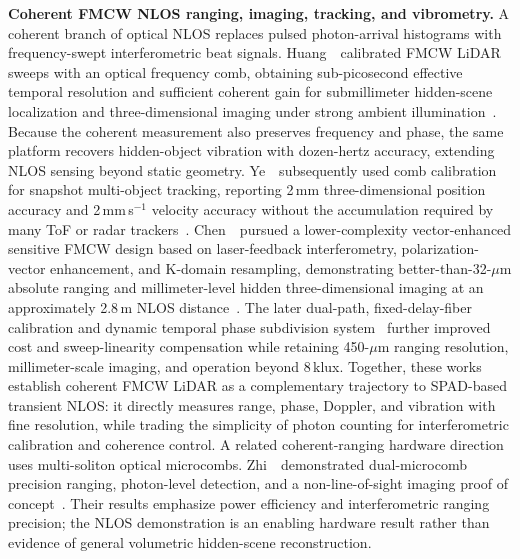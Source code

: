 \vspace{0.8mm}
\noindent \textbf{Coherent FMCW NLOS ranging, imaging, tracking, and vibrometry.}
A coherent branch of optical NLOS replaces pulsed photon-arrival histograms with frequency-swept interferometric beat signals. Huang~\etal~calibrated FMCW LiDAR sweeps with an optical frequency comb, obtaining sub-picosecond effective temporal resolution and sufficient coherent gain for submillimeter hidden-scene localization and three-dimensional imaging under strong ambient illumination~\cite{huangCombCalibratedNLOS2024}. Because the coherent measurement also preserves frequency and phase, the same platform recovers hidden-object vibration with dozen-hertz accuracy, extending NLOS sensing beyond static geometry. Ye~\etal~subsequently used comb calibration for snapshot multi-object tracking, reporting 2\,mm three-dimensional position accuracy and 2\,mm\,s$^{-1}$ velocity accuracy without the accumulation required by many ToF or radar trackers~\cite{yeCombCalibratedFMCWTracking2025}. Chen~\etal~pursued a lower-complexity vector-enhanced sensitive FMCW design based on laser-feedback interferometry, polarization-vector enhancement, and K-domain resampling, demonstrating better-than-32-$\mu$m absolute ranging and millimeter-level hidden three-dimensional imaging at an approximately 2.8\,m NLOS distance~\cite{chenVectorEnhancedFMCWNLOS2025}. The later dual-path, fixed-delay-fiber calibration and dynamic temporal phase subdivision system~\cite{liangFMCWNLOS2026} further improved cost and sweep-linearity compensation while retaining 450-$\mu$m ranging resolution, millimeter-scale imaging, and operation beyond 8\,klux. Together, these works establish coherent FMCW LiDAR as a complementary trajectory to SPAD-based transient NLOS: it directly measures range, phase, Doppler, and vibration with fine resolution, while trading the simplicity of photon counting for interferometric calibration and coherence control.
A related coherent-ranging hardware direction uses multi-soliton optical microcombs. Zhi~\etal~demonstrated dual-microcomb precision ranging, photon-level detection, and a non-line-of-sight imaging proof of concept~\cite{zhiMultiSolitonMicrocombNLOS2026}. Their results emphasize power efficiency and interferometric ranging precision; the NLOS demonstration is an enabling hardware result rather than evidence of general volumetric hidden-scene reconstruction.

